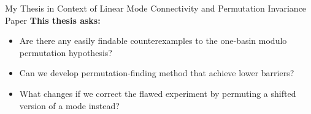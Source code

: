 \documentclass[aspectratio=169,11pt]{beamer}
\begin{document}
\begin{frame}{My Thesis in Context of Linear Mode Connectivity and Permutation Invariance Paper}
  \vspace{1em}
  \textbf{This thesis asks:}
  \begin{itemize}
    \item Are there any easily findable counterexamples to the one-basin modulo permutation hypothesis?
    \item Can we develop permutation-finding method that achieve lower barriers?
    \item What changes if we correct the flawed experiment by permuting a shifted version of a mode instead?
  \end{itemize}
  
\end{frame}
\end{document}
